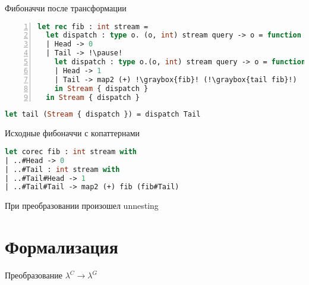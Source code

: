 \documentclass[10pt, mathserif]{beamer}
\newcommand{\graybox}[1]{\colorbox{light-gray}{#1}}
\theoremstyle{definition}
\begin{document}
\begin{frame}[fragile]{Фибоначчи после трансформации}
\begin{lstlisting}[language=ocaml,numbers=left,stepnumber=1]
let rec fib : int stream =
  let dispatch : type o. (o, int) stream query -> o = function
  | Head -> 0
  | Tail -> !\pause!
    let dispatch : type o.(o, int) stream query -> o = function
    | Head -> 1
    | Tail -> map2 (+) !\graybox{fib}! (!\graybox{tail fib}!)
    in Stream { dispatch }
  in Stream { dispatch }
\end{lstlisting}
\begin{lstlisting}[language=ocaml]
let tail (Stream { dispatch }) = dispatch Tail
\end{lstlisting}


\end{frame}

\begin{frame}[fragile]{Исходные фибоначчи с копаттернами}
\begin{lstlisting}[language=ocaml]
let corec fib : int stream with
| ..#Head -> 0
| ..#Tail : int stream with
| ..#Tail#Head -> 1
| ..#Tail#Tail -> map2 (+) fib (fib#Tail)
\end{lstlisting}

При преобразовании произошел unnesting
\end{frame}


\section{Формализация}

\begin{frame}[c]{Преобразование}
\centering
{\LARGE $\lambda^C \to \lambda^G$}
\end{frame}
\end{document}
